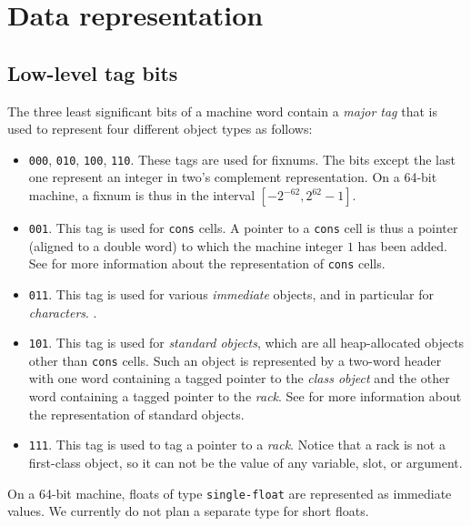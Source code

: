 \chapter{Data representation}
\label{chap-data-representation}

\section{Low-level tag bits}

The three least significant bits of a machine word contain a
\emph{major tag} that is used to represent four different object types
as follows:

\begin{itemize}
\item \texttt{000}, \texttt{010}, \texttt{100}, \texttt{110}.  These
  tags are used for fixnums.  The bits except the last one represent
  an integer in two's complement representation.  On a 64-bit machine,
  a fixnum is thus in the interval $[-2^{-62}, 2^{62} - 1]$.
\item \texttt{001}.  This tag is used for \texttt{cons} cells.  A
  pointer to a \texttt{cons} cell is thus a pointer (aligned to a
  double word) to which the machine integer $1$ has been added.  See
   for more information
  about the representation of \texttt{cons} cells.
\item \texttt{011}.  This tag is used for various \emph{immediate}
  objects, and in particular for \emph{characters}.
  .
\item \texttt{101}.  This tag is used for \emph{standard objects},
  which are all heap-allocated objects other than \texttt{cons} cells.
  Such an object is represented by a two-word header with one
  word containing a tagged pointer to the \emph{class object} and the
  other word containing a tagged pointer to the \emph{rack}.  See
   for more
  information about the representation of standard objects.
\item \texttt{111}.  This tag is used to tag a pointer to a
  \emph{rack}.  Notice that a rack is not a first-class \commonlisp{}
  object, so it can not be the value of any variable, slot, or
  argument.
\end{itemize}

On a 64-bit machine, floats of type \texttt{single-float} are
represented as immediate values.  We currently do not plan a separate
type for short floats.

